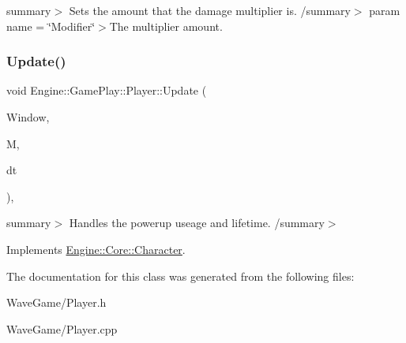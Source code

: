 summary$>$ Sets the amount that the damage multiplier is. /summary$>$ param name = \char`\"{}\+Modifier\char`\"{}$>$The multiplier amount.\mbox{\label{class_engine_1_1_game_play_1_1_player_a06c682bf13c20fb2390807ec681b0121}} 
\subsubsection{\texorpdfstring{Update()}{Update()}}
{\footnotesize\ttfamily void Engine\+::\+Game\+Play\+::\+Player\+::\+Update (\begin{DoxyParamCaption}\item[{Render\+Window $\ast$}]{Window,  }\item[{\hyperlink{class_engine_1_1_core_1_1_map}{Map}}]{M,  }\item[{float}]{dt }\end{DoxyParamCaption})\hspace{0.3cm}{\ttfamily [override]}, {\ttfamily [virtual]}}

summary$>$ Handles the powerup useage and lifetime. /summary$>$ 

Implements \hyperlink{class_engine_1_1_core_1_1_character}{Engine\+::\+Core\+::\+Character}.



The documentation for this class was generated from the following files\+:\begin{DoxyCompactItemize}
\item 
Wave\+Game/Player.\+h\item 
Wave\+Game/Player.\+cpp\end{DoxyCompactItemize}

